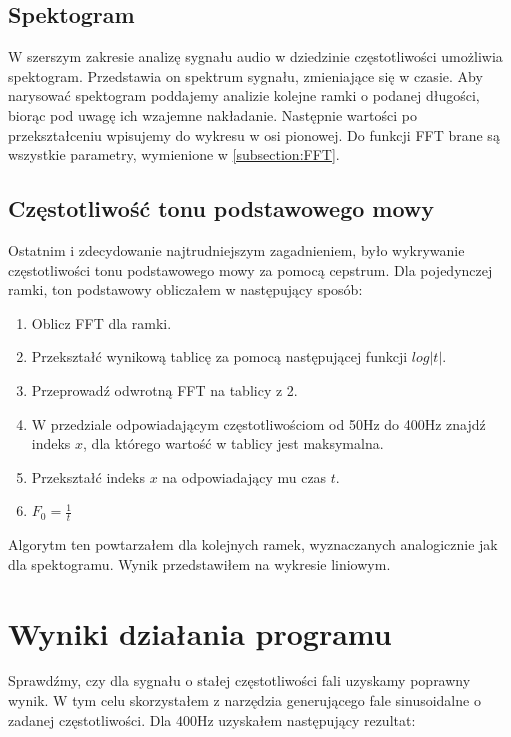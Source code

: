 \documentclass{article}
\begin{document}
\subsection{Spektogram}

W szerszym zakresie analizę sygnału audio w dziedzinie częstotliwości umożliwia spektogram. Przedstawia on spektrum sygnału, zmieniające się w czasie. Aby narysować spektogram poddajemy analizie kolejne ramki o podanej długości, biorąc pod uwagę ich wzajemne nakładanie. Następnie wartości po przekształceniu wpisujemy do wykresu w osi pionowej. Do funkcji FFT brane są wszystkie parametry, wymienione w \ref{subsection:FFT}.

\subsection{Częstotliwość tonu podstawowego mowy}

Ostatnim i zdecydowanie najtrudniejszym zagadnieniem, było wykrywanie częstotliwości tonu podstawowego mowy za pomocą cepstrum. Dla pojedynczej ramki, ton podstawowy obliczałem w następujący sposób:
\begin{enumerate}
\item Oblicz FFT dla ramki.
\item Przekształć wynikową tablicę za pomocą następującej funkcji $log|t|$.
\item Przeprowadź odwrotną FFT na tablicy z 2.
\item W przedziale odpowiadającym częstotliwościom od 50Hz do 400Hz znajdź indeks $x$, dla którego wartość w tablicy jest maksymalna.
\item Przekształć indeks $x$ na odpowiadający mu czas $t$.
\item $F_0 = \frac{1}{t}$
\end{enumerate}

Algorytm ten powtarzałem dla kolejnych ramek, wyznaczanych analogicznie jak dla spektogramu. Wynik przedstawiłem na wykresie liniowym.

\section{Wyniki działania programu}

Sprawdźmy, czy dla sygnału o stałej częstotliwości fali uzyskamy poprawny wynik. W tym celu skorzystałem z narzędzia generującego fale sinusoidalne o zadanej częstotliwości. Dla 400Hz uzyskałem następujący rezultat:
\end{document}
